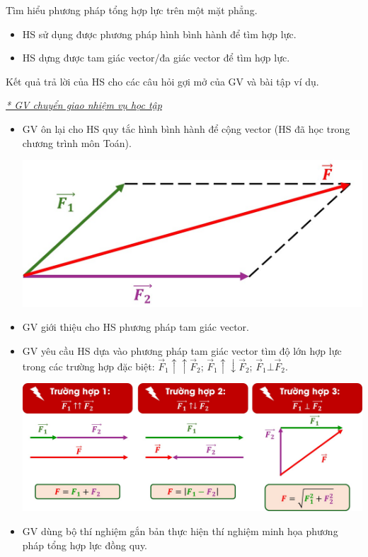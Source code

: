 \hoatdong
{Tìm hiểu phương pháp tổng hợp lực trên một mặt phẳng.
}
{\begin{itemize}
		\item HS sử dụng được phương pháp hình bình hành để tìm hợp lực.
		\item HS dựng được tam giác vector/đa giác vector để tìm hợp lực.
	\end{itemize}
}
{Kết quả trả lời của HS cho các câu hỏi gợi mở của GV và bài tập ví dụ.
}
{\textit{\underline{* GV chuyển giao nhiệm vụ học tập}}
	\begin{itemize}[label=-]
		\item GV ôn lại cho HS quy tắc hình bình hành để cộng vector (HS đã học trong chương trình môn Toán).
		\begin{center}
			\includegraphics[scale=0.5]{figs/G10-BAI9-3}
		\end{center}
		\item GV giới thiệu cho HS phương pháp tam giác vector.
		\item GV yêu cầu HS dựa vào phương pháp tam giác vector tìm độ lớn hợp lực trong các trường hợp đặc biệt: $\vec{F}_1\uparrow\uparrow\vec{F}_2$; $\vec{F}_1\uparrow\downarrow \vec{F}_2$; $\vec{F}_1\bot\vec{F}_2$.
		\begin{center}
			\includegraphics[scale=0.5]{figs/G10-BAI9-4}
		\end{center}
		\item GV dùng bộ thí nghiệm gắn bản thực hiện thí nghiệm minh họa phương pháp tổng hợp lực đồng quy.

\end{itemize}}
